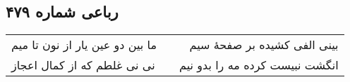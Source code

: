 \begin{center}
\section*{رباعی شماره ۴۷۹}
\label{sec:sh479}
\begin{longtable}{l p{0.5cm} r}
ما بین دو عین یار از نون تا میم
&&
بینی الفی کشیده بر صفحهٔ سیم
\\
نی نی غلطم که از کمال اعجاز
&&
انگشت نبیست کرده مه را بدو نیم
\\
\end{longtable}
\end{center}
